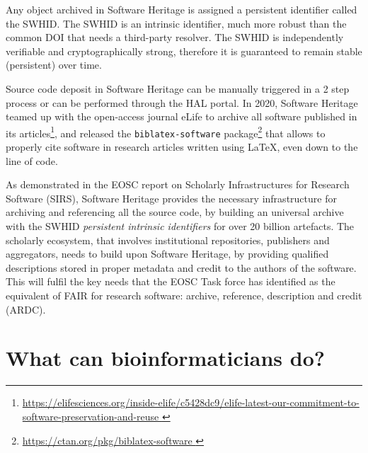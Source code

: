 \documentclass[long, final]{jobim}
\begin{document}
Any object archived in Software Heritage is assigned a persistent identifier called the SWHID. The SWHID is an intrinsic identifier, much more robust than the common DOI that needs a third-party resolver. The SWHID is independently verifiable and cryptographically strong, therefore it is guaranteed to remain stable (persistent) over time.

Source code deposit in Software Heritage can be manually triggered in a 2 step process or can be performed through the HAL portal\cite{barborini2018}. In 2020, Software Heritage teamed up with the open-access journal eLife to archive all software published in its articles\footnote{\url{https://elifesciences.org/inside-elife/c5428dc9/elife-latest-our-commitment-to-software-preservation-and-reuse }}, and released the \texttt{biblatex-software} package\footnote{\url{https://ctan.org/pkg/biblatex-software }} that allows to properly cite software in research articles written using LaTeX, even down to the line of code\cite{dicosmo2020}.

As demonstrated in the EOSC report on Scholarly Infrastructures for Research Software (SIRS)\cite{SIRSReport2020}, Software Heritage provides the necessary infrastructure for archiving and referencing all the source code, by building an universal archive with the SWHID \textit{persistent intrinsic identifiers} for over 20 billion artefacts. The scholarly ecosystem, that involves institutional repositories, publishers and aggregators, needs to build upon Software Heritage, by providing qualified descriptions stored in proper metadata and credit to the authors of the software. This will fulfil the key needs that the EOSC Task force has identified as the equivalent of FAIR for research software: archive, reference, description and credit (ARDC). 

\section{What can bioinformaticians do?}
\end{document}
